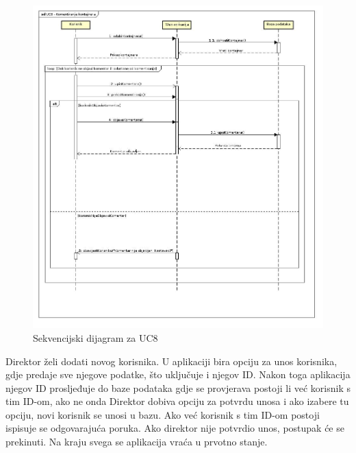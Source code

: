 			\eject
			
			\begin{figure}
				\centering
				\includegraphics[width=1.0\linewidth]{"slike/UC8-seq.jpg"}
				\caption{Sekvencijski dijagram za UC8}
				\label{fig:UC8-Seq}
			\end{figure}
			
			\clearpage
			
			\eject
			
			
			
			\noindent	Direktor želi dodati novog korisnika. U aplikaciji bira opciju za unos korisnika, gdje predaje sve njegove podatke, što uključuje i njegov ID. Nakon toga aplikacija njegov ID prosljeđuje do baze podataka gdje se provjerava postoji li već korisnik s tim ID-om, ako ne onda Direktor dobiva opciju za potvrdu unosa i ako izabere tu opciju, novi korisnik se unosi u bazu. Ako već korisnik s tim ID-om postoji ispisuje se odgovarajuća poruka. Ako direktor nije potvrdio unos, postupak će se prekinuti. Na kraju svega se aplikacija vraća u prvotno stanje.
			

